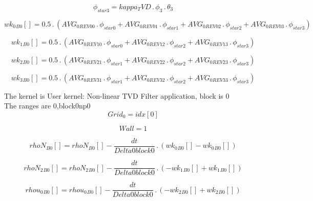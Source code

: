 \documentclass{article}
\begin{document}
\begin{dmath}\phi_{star 3} = kappa_TVD \,.\, \phi_{3} \,.\, \theta_{3}\end{dmath}

\begin{dmath}{wk_{0}{_{B0}}}[{}] = 0.5 \,.\, \left(AVG_{0 REV 00} \,.\, \phi_{star 0} + AVG_{0 REV 01} \,.\, \phi_{star 1} + AVG_{0 REV 02} \,.\, \phi_{star 2} + AVG_{0 REV 03} \,.\, \phi_{star 3}\right)\end{dmath}

\begin{dmath}{wk_{1}{_{B0}}}[{}] = 0.5 \,.\, \left(AVG_{0 REV 10} \,.\, \phi_{star 0} + AVG_{0 REV 12} \,.\, \phi_{star 2} + AVG_{0 REV 13} \,.\, \phi_{star 3}\right)\end{dmath}

\begin{dmath}{wk_{2}{_{B0}}}[{}] = 0.5 \,.\, \left(AVG_{0 REV 21} \,.\, \phi_{star 1} + AVG_{0 REV 22} \,.\, \phi_{star 2} + AVG_{0 REV 23} \,.\, \phi_{star 3}\right)\end{dmath}

\begin{dmath}{wk_{3}{_{B0}}}[{}] = 0.5 \,.\, \left(AVG_{0 REV 31} \,.\, \phi_{star 1} + AVG_{0 REV 32} \,.\, \phi_{star 2} + AVG_{0 REV 33} \,.\, \phi_{star 3}\right)\end{dmath}

\noindent The kernel is User kernel: Non-linear TVD Filter application, block is 0\\\noindent The ranges are 0,block0np0\\\begin{dmath}Grid_{0} = {idx}[{0}]\end{dmath}

\begin{dmath}Wall = 1\end{dmath}

\begin{dmath}{rhoN{_{B0}}}[{}] = {rhoN{_{B0}}}[{}] - \frac{dt}{Delta0block0} \,.\, \left({wk_{0}{_{B0}}}[{}] - {wk_{0}{_{B0}}}[{}]\right)\end{dmath}

\begin{dmath}{rhoN_{2}{_{B0}}}[{}] = {rhoN_{2}{_{B0}}}[{}] - \frac{dt}{Delta0block0} \,.\, \left(- {wk_{1}{_{B0}}}[{}] + {wk_{1}{_{B0}}}[{}]\right)\end{dmath}

\begin{dmath}{rhou_{0}{_{B0}}}[{}] = {rhou_{0}{_{B0}}}[{}] - \frac{dt}{Delta0block0} \,.\, \left(- {wk_{2}{_{B0}}}[{}] + {wk_{2}{_{B0}}}[{}]\right)\end{dmath}
\end{document}
